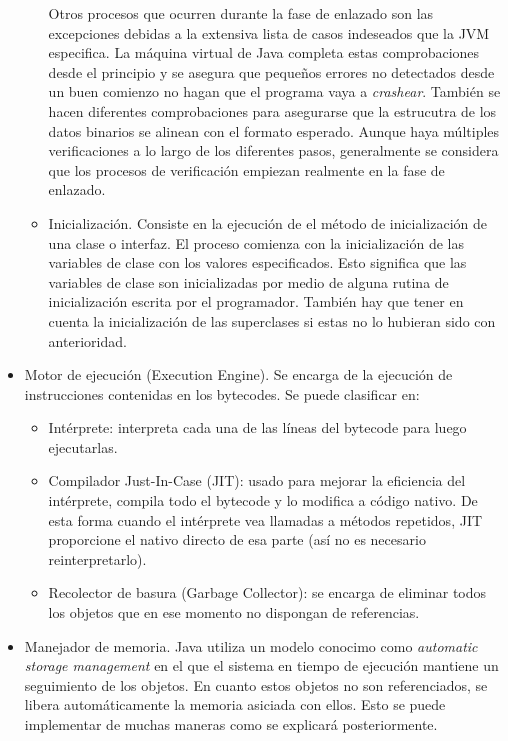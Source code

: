 \documentclass[english,runningheads,a4paper]{llncs}[2018/03/10]
\begin{document}
\begin{itemize}
\begin{itemize}
Otros procesos que ocurren durante la fase de enlazado son las excepciones
debidas a la extensiva lista de casos indeseados que la JVM especifica. La máquina virtual de Java completa
estas comprobaciones desde el principio y se asegura que pequeños errores no
detectados desde un buen comienzo no hagan que el programa vaya a
\textit{crashear}. También se hacen diferentes comprobaciones para asegurarse
que la estrucutra de los datos binarios se alinean con el formato esperado.
Aunque haya múltiples verificaciones a lo largo de los diferentes pasos,
generalmente se considera que los procesos de verificación empiezan realmente en
la fase de enlazado.

        \item Inicialización. Consiste en la ejecución de el método de inicialización de una clase o interfaz.  El proceso comienza con
la inicialización de las variables de clase con los valores especificados. Esto
significa que las variables de clase son inicializadas por medio de alguna
rutina de inicialización escrita por el programador. También hay que tener en
cuenta la inicialización de las superclases si estas no lo hubieran sido con
anterioridad. 
    \end{itemize}
    \item Motor de ejecución (Execution Engine). Se encarga de la ejecución de instrucciones contenidas en los bytecodes. Se puede clasificar en: 
        \begin{itemize}
            \item Intérprete: interpreta cada una de las líneas del bytecode para luego ejecutarlas.
            \item Compilador Just-In-Case (JIT): usado para mejorar la eficiencia del intérprete, compila todo el bytecode y lo modifica a código nativo. De esta forma cuando el intérprete vea llamadas a métodos repetidos, JIT proporcione el nativo directo de esa parte (así no es necesario reinterpretarlo).
            \item Recolector de basura (Garbage Collector): se encarga de eliminar todos los objetos que en ese momento no dispongan de referencias.
        \end{itemize}
    \item Manejador de memoria. Java utiliza un modelo conocimo como \textit{automatic storage management} en el que el sistema en tiempo de ejecución mantiene un seguimiento de los objetos. En cuanto estos objetos no son referenciados, se libera automáticamente la memoria asiciada con ellos. Esto se puede implementar de muchas maneras como se explicará posteriormente.

\end{itemize}
\end{document}
